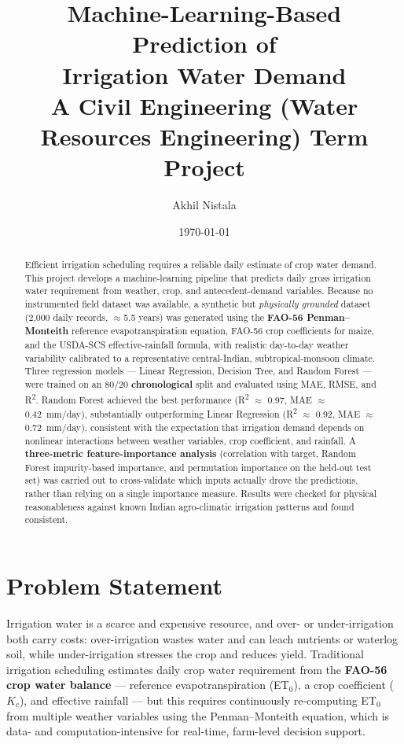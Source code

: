\documentclass[11pt,a4paper]{article}
\title{\textbf{Machine-Learning-Based Prediction of\\Irrigation Water Demand}\\[0.3em]
\large A Civil Engineering (Water Resources Engineering) Term Project}
\author{Akhil Nistala}
\date{\today}
\begin{document}
\maketitle
\thispagestyle{empty}

\begin{abstract}
\noindent
Efficient irrigation scheduling requires a reliable daily estimate of crop water
demand. This project develops a machine-learning pipeline that predicts daily
gross irrigation water requirement from weather, crop, and antecedent-demand
variables. Because no instrumented field dataset was available, a synthetic but
\emph{physically grounded} dataset (2{,}000 daily records, $\approx$5.5 years) was
generated using the \textbf{FAO-56 Penman--Monteith} reference evapotranspiration
equation, FAO-56 crop coefficients for maize, and the USDA-SCS effective-rainfall
formula, with realistic day-to-day weather variability calibrated to a
representative central-Indian, subtropical-monsoon climate. Three regression
models --- Linear Regression, Decision Tree, and Random Forest --- were trained
on an 80/20 \textbf{chronological} split and evaluated using MAE, RMSE, and
R\textsuperscript{2}. Random Forest achieved the best performance
(R\textsuperscript{2} $\approx$ 0.97, MAE $\approx$ 0.42~mm/day), substantially
outperforming Linear Regression (R\textsuperscript{2} $\approx$
0.92, MAE $\approx$ 0.72~mm/day), consistent with the expectation that irrigation
demand depends on nonlinear interactions between weather variables, crop
coefficient, and rainfall. A \textbf{three-metric feature-importance analysis}
(correlation with target, Random Forest impurity-based importance, and
permutation importance on the held-out test set) was carried out to
cross-validate which inputs actually drove the predictions, rather than relying
on a single importance measure. Results were checked for physical reasonableness
against known Indian agro-climatic irrigation patterns and found consistent.
\end{abstract}

\vspace{1em}

\section{Problem Statement}

Irrigation water is a scarce and expensive resource, and over- or
under-irrigation both carry costs: over-irrigation wastes water and can leach
nutrients or waterlog soil, while under-irrigation stresses the crop and reduces
yield. Traditional irrigation scheduling estimates daily crop water requirement
from the \textbf{FAO-56 crop water balance} --- reference evapotranspiration
(ET$_0$), a crop coefficient ($K_c$), and effective rainfall --- but this
requires continuously re-computing ET$_0$ from multiple weather variables using
the Penman--Monteith equation, which is data- and computation-intensive for
real-time, farm-level decision support.
\end{document}

